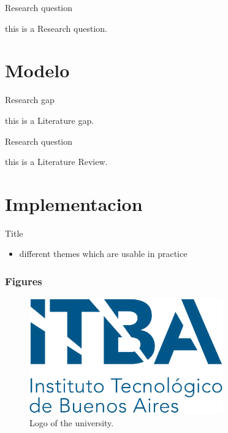 \documentclass[serif, aspectratio=169]{beamer}
\begin{document}
\begin{frame}{Research question}

   this is a Research question.

\end{frame}

\section{Modelo}
\begin{frame}{Research gap}

   this is a Literature gap.

\end{frame}

\begin{frame}{Research question}

   this is a Literature Review.

\end{frame}

\section{Implementacion}
\begin{frame}{Title}
    \begin{itemize}
        \item different themes which are usable in practice
    \end{itemize}
\end{frame}

\begin{frame}
	\frametitle<presentation>{Figures}
	\begin{figure}
		\centering
			\includegraphics[height=5cm]{pic/itba.png}
		\caption{Logo of the university.}
		\label{fig:unilogo}
	\end{figure}
\end{frame}
\end{document}
